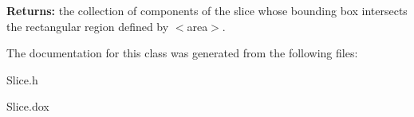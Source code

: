 {\bfseries Returns\+:} the collection of components of the slice whose bounding box intersects the rectangular region defined by {\ttfamily $<$area$>$}. 

The documentation for this class was generated from the following files\+:\begin{DoxyCompactItemize}
\item 
Slice.\+h\item 
Slice.\+dox\end{DoxyCompactItemize}
